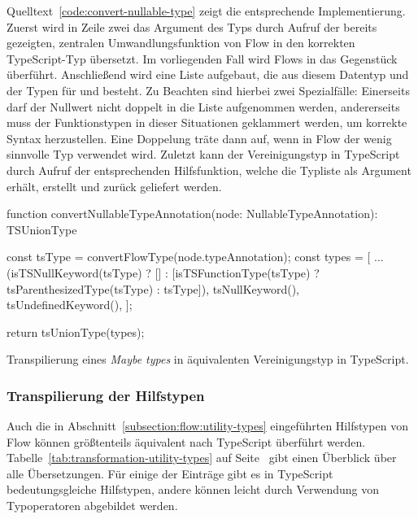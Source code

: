 Quelltext~\ref{code:convert-nullable-type} zeigt die entsprechende Implementierung. Zuerst wird in Zeile zwei das Argument des Typs  durch Aufruf der bereits gezeigten, zentralen Umwandlungsfunktion von Flow in den korrekten TypeScript-Typ übersetzt. Im vorliegenden Fall wird Flows  in das Gegenstück  überführt. Anschließend wird eine Liste aufgebaut, die aus diesem Datentyp und der Typen für  und  besteht. Zu Beachten sind hierbei zwei Spezialfälle: Einerseits darf der Nullwert nicht doppelt in die Liste aufgenommen werden, andererseits muss der Funktionstypen in dieser Situationen geklammert werden, um korrekte Syntax herzustellen. Eine Doppelung träte dann auf, wenn in Flow der wenig sinnvolle Typ  verwendet wird. Zuletzt kann der Vereinigungstyp in TypeScript durch Aufruf der entsprechenden Hilfsfunktion, welche die Typliste als Argument erhält, erstellt und zurück geliefert werden.

\bigbreak
\begin{listing}[htb]
\begin{textcode}
function convertNullableTypeAnnotation(node: NullableTypeAnnotation): TSUnionType {
  const tsType = convertFlowType(node.typeAnnotation);
  const types = [
    ...(isTSNullKeyword(tsType)
      ? []
      : [isTSFunctionType(tsType) ? tsParenthesizedType(tsType) : tsType]),
    tsNullKeyword(),
    tsUndefinedKeyword(),
  ];

  return tsUnionType(types);
}
\end{textcode}
\listingvspace
\caption{Transpilierung eines \textit{Maybe types} in äquivalenten Vereinigungstyp in TypeScript.}
\label{code:convert-nullable-type}
\end{listing}

\subsubsection{Transpilierung der Hilfstypen}

Auch die in Abschnitt~\ref{subsection:flow:utility-types} eingeführten Hilfstypen von Flow können größtenteils äquivalent nach TypeScript überführt werden. Tabelle~\ref{tab:transformation-utility-types} auf Seite~\pageref{tab:transformation-utility-types} gibt einen Überblick über alle Übersetzungen. Für einige der Einträge gibt es in TypeScript bedeutungsgleiche Hilfstypen, andere können leicht durch Verwendung von Typoperatoren abgebildet werden.

